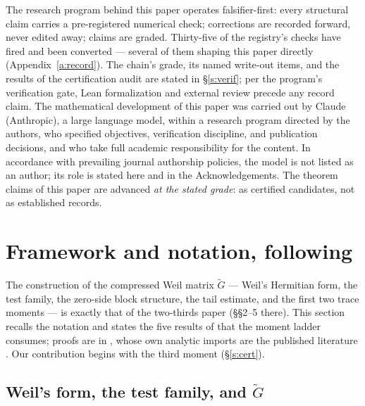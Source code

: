 \documentclass[11pt]{article}
\numberwithin{equation}{section}
\theoremstyle{definition}
\theoremstyle{remark}
\begin{document}
The research program behind this paper operates falsifier-first:
every structural claim carries a pre-registered numerical check;
corrections are recorded forward, never edited away; claims are
graded. Thirty-five of the registry's checks have fired and been
converted --- several of them shaping this paper directly
(Appendix~\ref{a:record}). The chain's grade, its named
write-out items, and the results of the certification audit are
stated in \S\ref{s:verif}; per the program's verification gate,
Lean formalization and external review precede any record claim.
The mathematical development of this paper was carried out by
Claude (Anthropic), a large language model, within a research
program directed by the authors, who specified objectives,
verification discipline, and publication decisions, and who take
full academic responsibility for the content. In accordance with
prevailing journal authorship policies, the model is not listed
as an author; its role is stated here and in the
Acknowledgements. The theorem claims of this paper are advanced
\emph{at the stated grade}: as certified candidates, not as
established records.

\section{Framework and notation, following
\cite{C26}}\label{s:frame}

The construction of the compressed Weil matrix $\widetilde G$
--- Weil's Hermitian form, the test family, the zero-side block
structure, the tail estimate, and the first two trace moments
--- is exactly that of the two-thirds paper \cite{C26}
(\S\S2--5 there). This section recalls the notation and states
the five results of \cite{C26} that the moment ladder consumes;
proofs are in \cite{C26}, whose own analytic imports are the
published literature \cite{Wei52,IK,Tit86,Mon73,BGST}. Our
contribution begins with the third moment
(\S\ref{s:cert}).

\subsection{Weil's form, the test family, and
$\widetilde G$}\label{s:frame:G}
\end{document}
